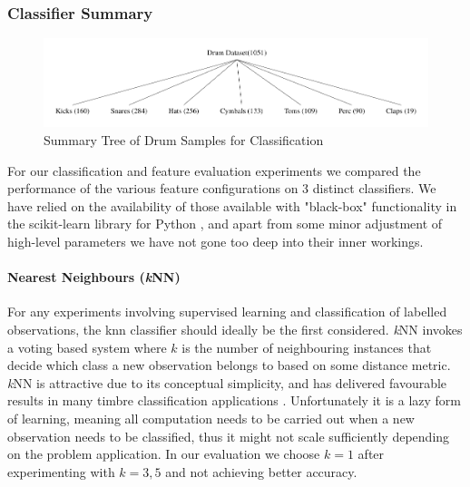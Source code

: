 {{{{\subsubsection{Classifier Summary}

\begin{figure}
	\begin{center}
		\includegraphics[width=1.0\textwidth]{ch05_pyconcat/figures/drum_distribution.pdf}
	\end{center}
	\caption[Summary Tree of Drum Samples for Classification]{Summary Tree of Drum Samples for Classification}
	\label{fig:drum_tree}
\end{figure}

For our classification and feature evaluation experiments we compared the performance of the various feature configurations on 3 distinct classifiers. We have relied on the availability of those available with "black-box" functionality in the scikit-learn library for Python \citep{Pedregosa2012}, and apart from some minor adjustment of high-level parameters we have not gone too deep into their inner workings.

\paragraph{Nearest Neighbours (\textit{k}NN)}

For any experiments involving supervised learning and classification of labelled observations, the \acrfull{knn} classifier should ideally be the first considered. \textit{k}NN invokes a voting based system where $k$ is the number of neighbouring instances that decide which class a new observation belongs to based on some distance metric. \textit{k}NN is attractive due to its conceptual simplicity, and has delivered favourable results in many timbre classification applications \citep{Herrera2002, Herrera2003, Herrera-Boyer2003, Cano2004, Cano2005, Mandel2005, Wang2006, Somerville2008}. Unfortunately it is a lazy form of learning, meaning all computation needs to be carried out when a new observation needs to be classified, thus it might not scale sufficiently depending on the problem application. In our evaluation we choose $k=1$ after  experimenting with $k=3,5$ and not achieving better accuracy.

}}}}
